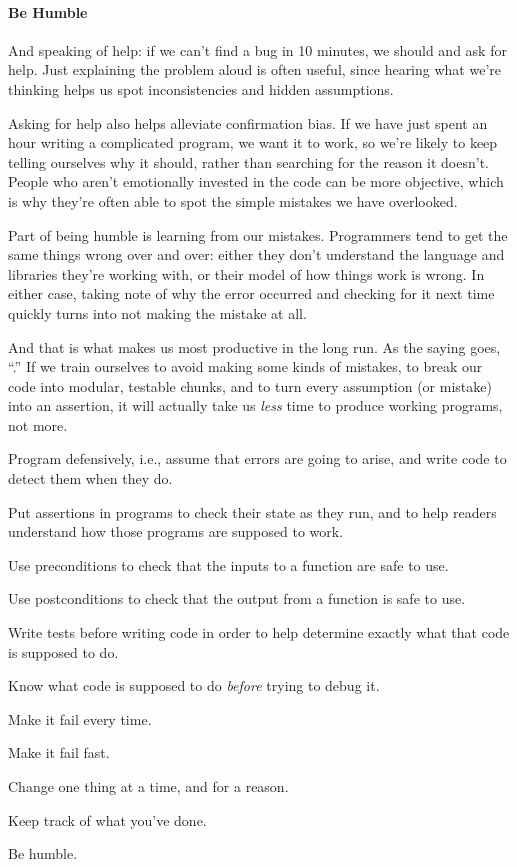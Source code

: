 \documentclass{book}
\begin{document}
\mbox{}\paragraph{Be Humble}

And speaking of help: if we can't find a bug in 10 minutes, we should
 and ask for help. Just
explaining the problem aloud is often useful, since hearing what we're
thinking helps us spot inconsistencies and hidden assumptions.

Asking for help also helps alleviate confirmation bias. If we have just
spent an hour writing a complicated program, we want it to work, so
we're likely to keep telling ourselves why it should, rather than
searching for the reason it doesn't. People who aren't emotionally
invested in the code can be more objective, which is why they're often
able to spot the simple mistakes we have overlooked.

Part of being humble is learning from our mistakes. Programmers tend to
get the same things wrong over and over: either they don't understand
the language and libraries they're working with, or their model of how
things work is wrong. In either case, taking note of why the error
occurred and checking for it next time quickly turns into not making the
mistake at all.

And that is what makes us most productive in the long run. As the saying
goes, ``.'' If we train
ourselves to avoid making some kinds of mistakes, to break our code into
modular, testable chunks, and to turn every assumption (or mistake) into
an assertion, it will actually take us \emph{less} time to produce
working programs, not more.

\begin{keypoints}
\begin{swcitemize}
\item
  Program defensively, i.e., assume that errors are going to arise, and
  write code to detect them when they do.
\item
  Put assertions in programs to check their state as they run, and to
  help readers understand how those programs are supposed to work.
\item
  Use preconditions to check that the inputs to a function are safe to
  use.
\item
  Use postconditions to check that the output from a function is safe to
  use.
\item
  Write tests before writing code in order to help determine exactly
  what that code is supposed to do.
\item
  Know what code is supposed to do \emph{before} trying to debug it.
\item
  Make it fail every time.
\item
  Make it fail fast.
\item
  Change one thing at a time, and for a reason.
\item
  Keep track of what you've done.
\item
  Be humble.
\end{swcitemize}
\end{keypoints}
\end{document}
